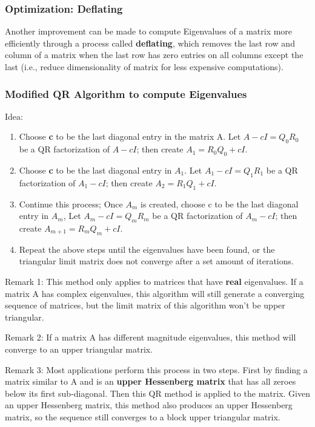 \documentclass{article}
\begin{document}
\subsubsection{Optimization: Deflating}
Another improvement can be made to compute Eigenvalues of a matrix more efficiently through a process called \textbf{deflating}, which removes the last row and column of  a matrix when the last row has zero entries on all columns except the last (i.e., reduce dimensionality of matrix for less expensive computations).

\subsubsection{Modified QR Algorithm to compute Eigenvalues}

Idea:
\begin{enumerate}
    \item Choose \textbf{c} to be the last diagonal entry in the matrix A. Let $A-cI =Q_{0}R_{0}$ be a QR factorization of $A-cI$; then create $A_1 = R_{0}Q_{0}+cI$.
    \item Choose \textbf{c} to be the last diagonal entry in $A_{1}$. Let $A_{1}-cI =Q_{1}R_{1}$ be a QR factorization of $A_{1}-cI$; then create $A_2 = R_{1}Q_{1}+cI$.
    \item Continue this process; Once $A_m$ is created, choose c to be the last diagonal entry in $A_m$, Let $A_{m}-cI =Q_{m}R_{m}$ be a QR factorization of $A_{m}-cI$; then create $A_{m+1} = R_{m}Q_{m}+cI$.
    \item Repeat the above steps until the eigenvalues have been found, or the triangular limit matrix does not converge after a set amount of iterations.
\end{enumerate}

Remark 1: This method only applies to matrices that have \textbf{real} eigenvalues. If a matrix A has complex eigenvalues, this algorithm will still generate a converging sequence of matrices, but the limit matrix of this algorithm won't be upper triangular.

Remark 2: If a matrix A has different magnitude eigenvalues, this method will converge to an upper triangular matrix.

Remark 3: Most applications perform this process in two steps. First by finding a matrix similar to A and is an \textbf{upper Hessenberg matrix} that has all zeroes below its first sub-diagonal. Then this QR method is applied to the matrix. Given an upper Hessenberg matrix, this method also produces an upper Hessenberg matrix, so the sequence still converges to a block upper triangular matrix.
\end{document}

